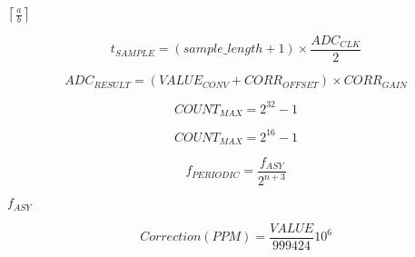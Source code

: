 \documentclass{article}
\begin{document}
$ \left\lceil \frac{a}{b} \right\rceil $
\pagebreak

\[ t_{SAMPLE} = (sample\_length+1) \times \frac{ADC_{CLK}} {2} \]
\pagebreak

\[ ADC_{RESULT} = (VALUE_{CONV} + CORR_{OFFSET}) \times CORR_{GAIN} \]
\pagebreak

\[ COUNT_{MAX} = 2^{32}-1 \]
\pagebreak

\[ COUNT_{MAX} = 2^{16}-1 \]
\pagebreak

\[ f_{PERIODIC}=\frac{f_{ASY}}{2^{n+3}} \]
\pagebreak

$f_{ASY}$
\pagebreak

\[ Correction(PPM) = \frac{VALUE}{999424}10^6 \]
\pagebreak
\end{document}

